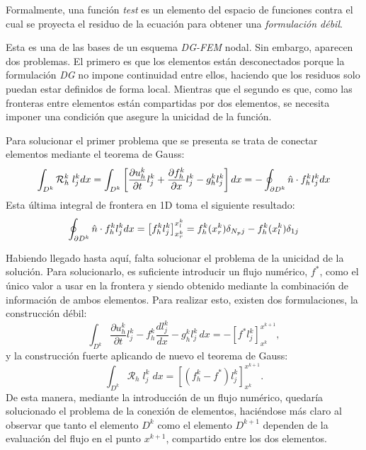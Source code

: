 \documentclass[11pt,a4paper,twoside,pdf]{article}
\numberwithin{equation}{section}
\begin{document}
Formalmente, una función \textit{test} es un elemento del espacio de funciones contra el cual se proyecta el residuo de la ecuación para obtener una \textit{formulación débil}.

Esta es una de las bases de un esquema \textit{DG-FEM} nodal. Sin embargo, aparecen dos problemas. El primero es que los elementos están desconectados porque la formulación \textit{DG} no impone continuidad entre ellos, haciendo que los residuos solo puedan estar definidos de forma local. Mientras que el segundo es que, como las fronteras entre elementos están compartidas por dos elementos, se necesita imponer una condición que asegure la unicidad de la función.

Para solucionar el primer problema que se presenta se trata de conectar elementos mediante el teorema de Gauss:
\begin{equation}
    \int_{D^k} \mathcal{R}_h^k\;l_j^kdx=\int_{D^k}\left[\frac{\partial u^k_h}{\partial t}l_j^k + \frac{\partial f^k_h}{\partial x}l_j^k - g^k_hl_j^k\right]dx=-\oint_{\partial D^k}\hat{n}\cdot f_h^kl_j^kdx \notag
\end{equation}
Esta última integral de frontera en 1D toma el siguiente resultado:
\begin{equation}
  \oint_{\partial D^k}\hat{n}\cdot f_h^kl_j^kdx=\left[f_h^kl_j^k\right]^{x_l^k}_{x_r^k}=f_h^k(x_r^k)\delta_{N_{p} j}- f_h^k (x_l^k) \delta_{1j} \notag 
\end{equation}


Habiendo llegado hasta aquí, falta solucionar el problema de la unicidad de la solución. Para solucionarlo, es suficiente introducir un flujo numérico, $f^*$, como el único valor a usar en la frontera y siendo obtenido mediante la combinación de información de ambos elementos. Para realizar esto, existen dos formulaciones, la construcción débil:
\begin{equation}
\int_{D^k} \frac{\partial u_h^k}{\partial t} l_j^k - f_h^k \frac{dl_j^k}{dx} - g^k_h l_j^k \, dx = - \left[ f^* l_j^k \right]_{x^k}^{x^{k+1}} ,  \label{weak}
\end{equation}
y la construcción fuerte aplicando de nuevo el teorema de Gauss:
\begin{equation}
\int_{D^k} \mathcal{R}_h\;l_j^k\;dx=\left[(f_h^k-f^*)l_j^k\right]^{x^{k+1}}_{x^{k}}.     \label{strong}
\end{equation}
De esta manera, mediante la introducción de un flujo numérico, quedaría solucionado el problema de la conexión de elementos, haciéndose más claro al observar que tanto el elemento \(D^k\) como el elemento $D^{k+1}$ dependen de la evaluación del flujo en el punto $x^{k+1}$, compartido entre los dos elementos.
\end{document}

